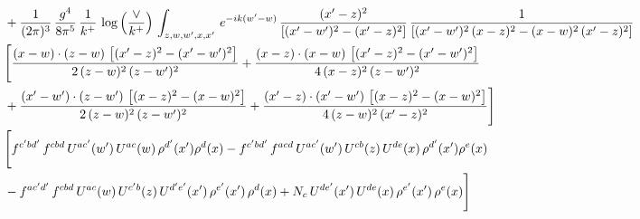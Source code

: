 \documentclass[9pt]{article}
\numberwithin{equation}{section}
\begin{document}
\begin{align}
& +\frac{1}{(2\pi)^{3}}\, \frac{g^{4}}{8\pi^{5}}\,\frac{1}{k^{+}}\,\log{\left(\frac{\vee}{k^{+}}\right)}\,\int_{z,w,w^{\prime},x,x'}\, e^{-ik(w^{\prime}-w)}\,\frac{(x'-z)^{2}}{\left[(x'-w')^{2}-(x'-z)^{2}\right]}\,\frac{1}{\left[(x'-w')^{2}\,(x-z)^{2} - (x-w)^{2}\,(x'-z)^{2}\right]}\notag \\ & \Bigg[\frac{(x-w)\cdot (z-w)\, \left[(x'-z)^{2}-(x'-w')^{2}\right]}{2\, (z-w)^{2}\, (z-w')^{2}}  + \frac{(x-z)\cdot (x-w)\,\left[(x'-z)^{2}-(x'-w')^{2}\right] }{4\,(x-z)^{2}\,(z-w')^{2}}\notag \\ & +\frac{(x'-w')\cdot (z-w')\, \left[(x-z)^{2}-(x-w)^{2}\right]}{2\, (z-w)^{2}\, (z-w')^{2}}+ \frac{(x'-z)\cdot (x'-w')\, \left[(x-z)^{2}-(x-w)^{2}\right]}{4\, (z-w)^{2}\,(x'-z)^{2}}\Bigg]\notag \\ &  \Bigg[f^{c'bd'}\,f^{cbd}\, U^{ac'}(w')\,U^{ac}(w)\,\rho^{d'}(x')\rho^{d}(x)- f^{c'bd'}\,f^{acd}\,U^{ac'}(w')\,U^{cb}(z)\,U^{de}(x)\,\rho^{d'}(x')\rho^{e}(x) \notag \\ & -f^{ac'd'}\,f^{cbd}\,U^{ac}(w)\,U^{c'b}(z)\,U^{d'e'}(x')\,\rho^{e'}(x')\,\rho^{d}(x) +N_{c}\,U^{de'}(x')\,U^{de}(x)\,\rho^{e'}(x')\,\rho^{e}(x)\Bigg]
\end{align}
\end{document}
